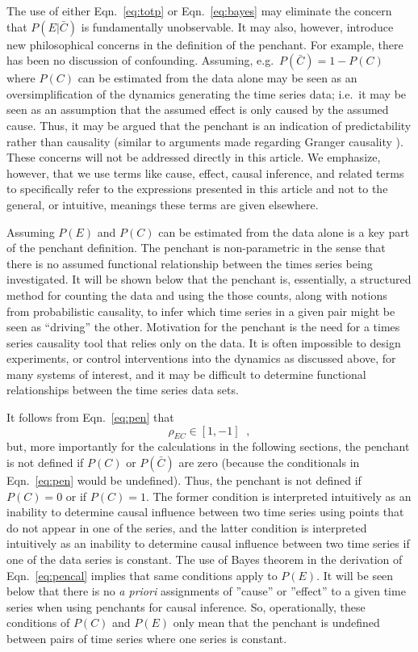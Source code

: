 \documentclass[a4paper,11pt,twocolumn]{article}
\begin{document}
The use of either Eqn.\ \ref{eq:totp} or Eqn.\ \ref{eq:bayes} may eliminate the concern that $P(E|\bar{C})$ is fundamentally unobservable.  It may also, however, introduce new philosophical concerns in the definition of the penchant.  For example, there has been no discussion of confounding.  Assuming, e.g.\  $P(\bar{C})=1-P(C)$ where $P(C)$ can be estimated from the data alone may be seen as an oversimplification of the dynamics generating the time series data; i.e.\ it may be seen as an assumption that the assumed effect is only caused by the assumed cause.  Thus, it may be argued that the penchant is an indication of predictability rather than causality (similar to arguments made regarding Granger causality \cite{Sugihara}).  These concerns will not be addressed directly in this article.  We emphasize, however, that we use terms like cause, effect, causal inference, and related terms to specifically refer to the expressions presented in this article and not to the general, or intuitive, meanings these terms are given elsewhere.

Assuming $P(E)$ and $P(C)$ can be estimated from the data alone is a key part of the penchant definition.  The penchant is non-parametric in the sense that there is no assumed functional relationship between the times series being investigated.  It will be shown below that the penchant is, essentially, a structured method for counting the data and using the those counts, along with notions from probabilistic causality, to infer which time series in a given pair might be seen as ``driving'' the other.  Motivation for the penchant is the need for a times series causality tool that relies only on the data.  It is often impossible to design experiments, or control interventions into the dynamics as discussed above, for many systems of interest, and it may be difficult to determine functional relationships between the time series data sets.

It follows from Eqn.\ \ref{eq:pen} that
\begin{equation}
\rho_{EC}\in\left[1,-1\right]\;\;,
\end{equation}
but, more importantly for the calculations in the following sections, the penchant is not defined if $P(C)$ or $P(\bar{C})$ are zero (because the conditionals in Eqn.\ \ref{eq:pen} would be undefined).  Thus, the penchant is not defined if $P(C)=0$ or if $P(C)=1$.  The former condition is interpreted intuitively as an inability to determine causal influence between two time series using points that do not appear in one of the series, and the latter condition is interpreted intuitively as an inability to determine causal influence between two time series if one of the data series is constant.  The use of Bayes theorem in the derivation of Eqn.\ \ref{eq:pencal} implies that same conditions apply to $P(E)$.  It will be seen below that there is no {\em a priori} assignments of ''cause'' or ''effect'' to a given time series when using penchants for causal inference.  So, operationally, these conditions of $P(C)$ and $P(E)$ only mean that the penchant is undefined between pairs of time series where one series is constant. 
\end{document}
